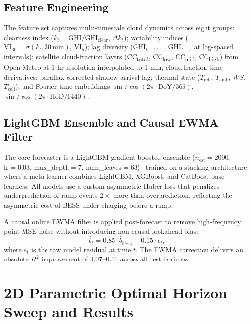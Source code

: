 \documentclass[conference]{IEEEtran}
\begin{document}
\subsection{Feature Engineering}

The feature set captures multi-timescale cloud dynamics across eight groups:
clearness index ($k_t=\mathrm{GHI}/\mathrm{GHI}_{\mathrm{clear}}$, $\Delta k_t$);
variability indices ($\mathrm{VI}_{30}=\sigma(k_t,30\,\mathrm{min})$,
$\mathrm{VI}_{5}$); lag diversity
($\mathrm{GHI}_{t-1},\ldots,\mathrm{GHI}_{t-x}$ at log-spaced intervals);
satellite cloud-fraction layers (CC\textsubscript{total}, CC\textsubscript{low},
CC\textsubscript{mid}, CC\textsubscript{high}) from Open-Meteo at 1-hr resolution
interpolated to 1-min; cloud-fraction time derivatives; parallax-corrected shadow
arrival lag; thermal state ($T_{\mathrm{cell}}$, $T_{\mathrm{amb}}$, $WS$,
$\dot{T}_{\mathrm{cell}}$); and Fourier time embeddings
$\sin/\cos(2\pi\cdot\mathrm{DoY}/365)$, $\sin/\cos(2\pi\cdot\mathrm{HoD}/1440)$.

\subsection{LightGBM Ensemble and Causal EWMA Filter}

The core forecaster is a LightGBM gradient-boosted ensemble
($n_{\mathrm{est}}=2000$, $\mathrm{lr}=0.03$, max\_depth$=7$,
num\_leaves$=63$)~\cite{b4} trained on a stacking architecture where a
meta-learner combines LightGBM, XGBoost, and CatBoost base learners.
All models use a custom asymmetric Huber loss that penalizes underprediction
of ramp events $2\times$ more than overprediction, reflecting the asymmetric
cost of BESS under-charging before a ramp.

A causal online EWMA filter is applied post-forecast to remove high-frequency
point-MSE noise without introducing non-causal lookahead bias:
\begin{equation}
  \hat{b}_t = 0.85\cdot\hat{b}_{t-1} + 0.15\cdot e_t,
  \label{eq:ewma}
\end{equation}
where $e_t$ is the raw model residual at time $t$. The EWMA correction delivers
an absolute $R^2$ improvement of 0.07--0.11 across all test horizons.

\section{2D Parametric Optimal Horizon Sweep and Results}
\end{document}
